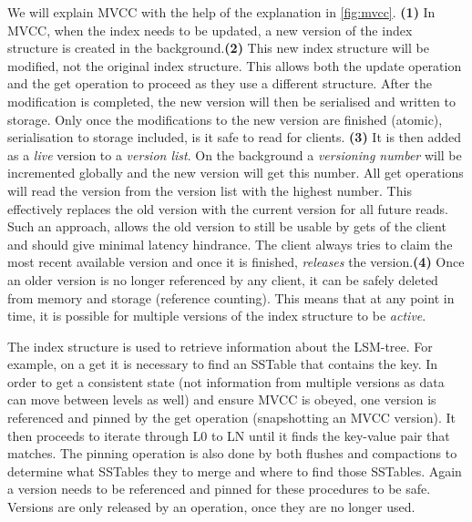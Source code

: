  We will explain MVCC with the help of the explanation in \autoref{fig:mvcc}. \textbf{(1)} In MVCC, when the index needs to be updated, a new version of the index structure is created in the background.\textbf{(2)} This new index structure will be modified, not the original index structure. This allows both the update operation and the get operation to proceed as they use a different structure. After the modification is completed, the new version will then be serialised and written to storage. Only once the modifications to the new version are finished (atomic), serialisation to storage included, is it safe to read for clients. \textbf{(3)} It is then added as a \textit{live} version to a \textit{version list}. On the background a \textit{versioning number} will be incremented globally and the new version will get this number. All get operations will read the version from the version list with the highest number. This effectively replaces the old version with the current version for all future reads. Such an approach, allows the old version to still be usable by gets of the client and should give minimal latency hindrance. The client always tries to claim the most recent available version and once it is finished, \textit{releases} the version.\textbf{(4)} Once an older version is no longer referenced by any client, it can be safely deleted from memory and storage (reference counting). This means that at any point in time, it is possible for multiple versions of the index structure to be \textit{active}. 
 
 The index structure is used to retrieve information about the LSM-tree. For example, on a get it is necessary to find an SSTable that contains the key. In order to get a consistent state (not information from multiple versions as data can move between levels as well) and ensure MVCC is obeyed, one version is referenced and pinned by the get operation (snapshotting an MVCC version). It then proceeds to iterate through L0 to LN until it finds the key-value pair that matches. The pinning operation is also done by both flushes and compactions to determine what SSTables they to merge and where to find those SSTables. Again a version needs to be referenced and pinned for these procedures to be safe. Versions are only released by an operation, once they are no longer used. 
 
